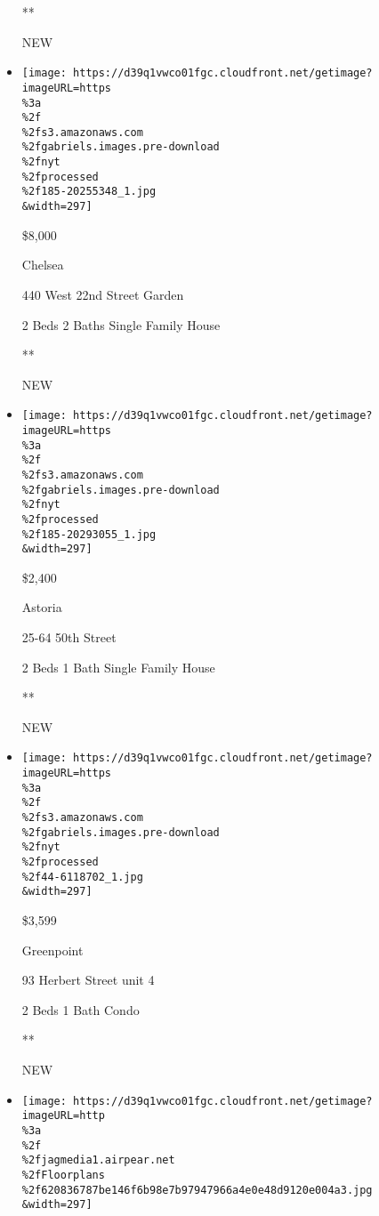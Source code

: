 \begin{itemize}
  **

  NEW
\item
  \href{/real-estate/usa/ny/new-york/chelsea/homes-for-rent/440-west-22nd-street-garden/185-20255348?}{}

  \texttt{[image: https://d39q1vwco01fgc.cloudfront.net/getimage?imageURL=https\\\%3a\\\%2f\\\%2fs3.amazonaws.com\\\%2fgabriels.images.pre-download\\\%2fnyt\\\%2fprocessed\\\%2f185-20255348\_1.jpg\\\&width=297]}

  \$8,000

  Chelsea

  440 West 22nd Street Garden

  2 Beds \textbar{} 2 Baths \textbar{} Single Family House

  **

  NEW
\item
  \href{/real-estate/usa/ny/queens/astoria/homes-for-rent/25-64-50th-street/185-20293055?}{}

  \texttt{[image: https://d39q1vwco01fgc.cloudfront.net/getimage?imageURL=https\\\%3a\\\%2f\\\%2fs3.amazonaws.com\\\%2fgabriels.images.pre-download\\\%2fnyt\\\%2fprocessed\\\%2f185-20293055\_1.jpg\\\&width=297]}

  \$2,400

  Astoria

  25-64 50th Street

  2 Beds \textbar{} 1 Bath \textbar{} Single Family House

  **

  NEW
\item
  \href{/real-estate/usa/ny/brooklyn/greenpoint/homes-for-rent/93-herbert-street/44-6118702?}{}

  \texttt{[image: https://d39q1vwco01fgc.cloudfront.net/getimage?imageURL=https\\\%3a\\\%2f\\\%2fs3.amazonaws.com\\\%2fgabriels.images.pre-download\\\%2fnyt\\\%2fprocessed\\\%2f44-6118702\_1.jpg\\\&width=297]}

  \$3,599

  Greenpoint

  93 Herbert Street unit 4

  2 Beds \textbar{} 1 Bath \textbar{} Condo

  **

  NEW
\item
  \href{/real-estate/usa/ny/new-york/lower-east-side/homes-for-rent/268-east-broadway/209-RPLU-62412031953?}{}

  \texttt{[image: https://d39q1vwco01fgc.cloudfront.net/getimage?imageURL=http\\\%3a\\\%2f\\\%2fjagmedia1.airpear.net\\\%2fFloorplans\\\%2f620836787be146f6b98e7b97947966a4e0e48d9120e004a3.jpg\\\&width=297]}


\end{itemize}
